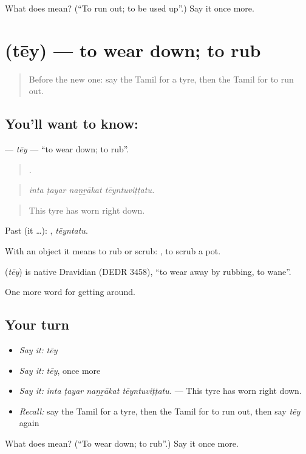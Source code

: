 \begin{tcolorbox}[breakable,colback=teal!4,colframe=teal!35!black,title={Before you move on}]
What does  mean? (\textquotedblleft{}To run out; to be used up\textquotedblright{}.) Say it once more.
\end{tcolorbox}
\section[\texorpdfstring{\ta{தேய்} (tēy)}{தேய் (tēy)}]{ (tēy) — to wear down; to rub}

\label{lesson:TA-C406-tey}



\begin{quote}
Before the new one: say the Tamil for a tyre, then the Tamil for to run out.
\end{quote}

\subsection*{You'll want to know: }
\textbf{} — \emph{tēy} — \textquotedblleft{}to wear down; to rub\textquotedblright{}.

\begin{quote}
   .
\end{quote}

\begin{quote}
\emph{inta ṭayar naṉṟākat tēyntuviṭṭatu.}
\end{quote}

\begin{quote}
This tyre has worn right down.
\end{quote}

Past (it …): , \emph{tēyntatu}.

With an object it means to rub or scrub:  , to scrub a pot.

\begin{cousinweb}
\textbf{} (\emph{tēy}) is native Dravidian (DEDR 3458), \textquotedblleft{}to wear away by rubbing, to wane\textquotedblright{}.
\end{cousinweb}

\begin{grammarlens}[title={What you've built}]
One more word for getting around.
\end{grammarlens}

\subsection*{Your turn}
\begin{itemize}
\raggedright
  \item \emph{Say it:} \emph{tēy}
  \item \emph{Say it:} \emph{tēy}, once more
  \item \emph{Say it:} \emph{inta ṭayar naṉṟākat tēyntuviṭṭatu.} — This tyre has worn right down.
  \item \emph{Recall:} say the Tamil for a tyre, then the Tamil for to run out, then say \emph{tēy} again
\end{itemize}

\begin{tcolorbox}[breakable,colback=teal!4,colframe=teal!35!black,title={Before you move on}]
What does  mean? (\textquotedblleft{}To wear down; to rub\textquotedblright{}.) Say it once more.
\end{tcolorbox}
